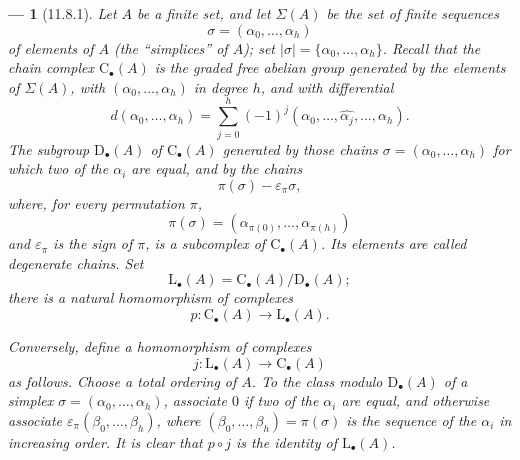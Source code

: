 \documentclass[oneside]{amsart}
\theoremstyle{ega-env-style}
\newtheorem*{env}{---}
\theoremstyle{ega-thm-env-style}
\theoremstyle{ega-defn-env-style}
\let\EGAOriginalLabel\label
\renewcommand{\label}[1]{\phantomsection\EGAOriginalLabel{#1}}
\begin{document}
\begin{env}[11.8.1]
\label{0.11.8.1}
Let $A$ be a finite set, and let $\Sigma(A)$ be the set of finite
sequences
\[
  \sigma=(\alpha_0,\ldots,\alpha_h)
\]
of elements of $A$ (the ``simplices'' of $A$); set
$|\sigma|=\{\alpha_0,\ldots,\alpha_h\}$.
Recall that the chain complex $\mathrm{C}_\bullet(A)$ is the graded free
abelian group generated by the elements of $\Sigma(A)$, with
$(\alpha_0,\ldots,\alpha_h)$ in degree $h$, and with differential
\[
  d(\alpha_0,\ldots,\alpha_h)
  =
  \sum_{j=0}^{h}(-1)^j
  (\alpha_0,\ldots,\widehat{\alpha_j},\ldots,\alpha_h).
\]
The subgroup $\mathrm{D}_\bullet(A)$ of $\mathrm{C}_\bullet(A)$ generated
by those chains $\sigma=(\alpha_0,\ldots,\alpha_h)$ for which two of the
$\alpha_i$ are equal, and by the chains
\[
  \pi(\sigma)-\varepsilon_\pi\sigma,
\]
where, for every permutation $\pi$,
\[
  \pi(\sigma)
  =
  (\alpha_{\pi(0)},\ldots,\alpha_{\pi(h)})
\]
and $\varepsilon_\pi$ is the sign of $\pi$, is a subcomplex of
$\mathrm{C}_\bullet(A)$.
Its elements are called \emph{degenerate chains}.
Set
\[
  \mathrm{L}_\bullet(A)
  =
  \mathrm{C}_\bullet(A)/\mathrm{D}_\bullet(A);
\]
there is a natural homomorphism of complexes
\[
  p:\mathrm{C}_\bullet(A)\longrightarrow\mathrm{L}_\bullet(A).
\]

Conversely, define a homomorphism of complexes
\[
  j:\mathrm{L}_\bullet(A)\longrightarrow\mathrm{C}_\bullet(A)
\]
as follows.
Choose a total ordering of $A$.
To the class modulo $\mathrm{D}_\bullet(A)$ of a simplex
$\sigma=(\alpha_0,\ldots,\alpha_h)$, associate $0$ if two of the
$\alpha_i$ are equal, and otherwise associate $\varepsilon_\pi(\beta_0,\ldots,\beta_h)$,
where $(\beta_0,\ldots,\beta_h)=\pi(\sigma)$ is the sequence of the $\alpha_i$ in
increasing order.
It is clear that $p\circ j$ is the identity of
$\mathrm{L}_\bullet(A)$.
\end{env}
\end{document}
